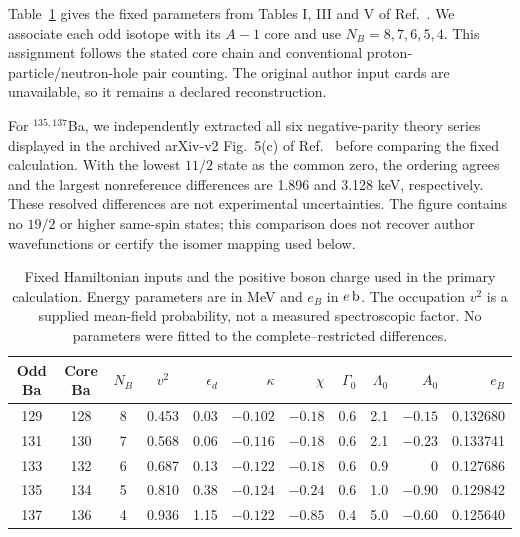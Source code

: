 \documentclass[pdflatex,iicol,sn-mathphys-num]{sn-jnl}
\begin{document}
Table~\ref{tab:inputs} gives the fixed parameters from Tables I, III and V of Ref.~\cite{Nomura2017}. We associate each odd isotope with its $A-1$ core and use $N_B=8,7,6,5,4$. This assignment follows the stated core chain and conventional proton-particle/neutron-hole pair counting. The original author input cards are unavailable, so it remains a declared reconstruction.

For $^{135,137}$Ba, we independently extracted all six negative-parity theory
series displayed in the archived arXiv-v2 Fig.~5(c) of
Ref.~\cite{Nomura2017} before comparing the fixed calculation.
With the lowest $11/2$ state as the common zero, the ordering agrees and
the largest nonreference differences are 1.896 and 3.128 keV, respectively.
These resolved differences are not experimental uncertainties.
The figure contains no $19/2$ or higher same-spin states; this comparison
does not recover author wavefunctions or certify the isomer mapping used below.

\begin{table}[t]
\caption{Fixed Hamiltonian inputs and the positive boson charge used in the primary calculation. Energy parameters are in MeV and $e_B$ in $e\,{\rm b}$. The occupation $v^2$ is a supplied mean-field probability, not a measured spectroscopic factor. No parameters were fitted to the complete--restricted differences.}\label{tab:inputs}
\centering
\begin{tabular}{ccccrrrrrrr}
\toprule
Odd Ba & Core Ba & $N_B$ & $v^2$ & $\epsilon_d$ & $\kappa$ & $\chi$ & $\Gamma_0$ & $\Lambda_0$ & $A_0$ & $e_B$\\
\midrule
129&128&8&0.453&0.03&$-0.102$&$-0.18$&0.6&2.1&$-0.15$&0.132680\\
131&130&7&0.568&0.06&$-0.116$&$-0.18$&0.6&2.1&$-0.23$&0.133741\\
133&132&6&0.687&0.13&$-0.122$&$-0.18$&0.6&0.9&0&0.127686\\
135&134&5&0.810&0.38&$-0.124$&$-0.24$&0.6&1.0&$-0.90$&0.129842\\
137&136&4&0.936&1.15&$-0.122$&$-0.85$&0.4&5.0&$-0.60$&0.125640\\
\bottomrule
\end{tabular}
\end{table}
\end{document}
